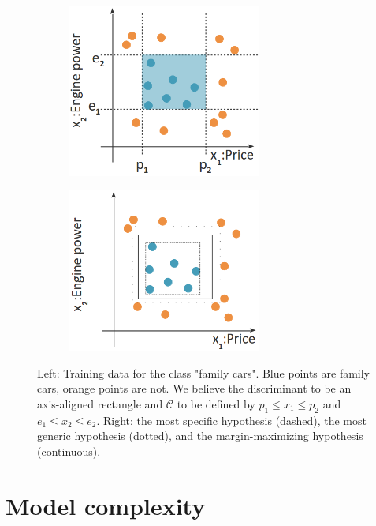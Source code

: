 \documentclass[a4paper,12pt]{article}
\newcommand{\cc}{\mathcal{C}}
\begin{document}
\begin{figure}[h]
  \centering
  \begin{subfigure}[c]{0.45\textwidth}
    \includegraphics[width=0.7\textwidth]{figures/car_data}
  \end{subfigure} \hfill
  \begin{subfigure}[c]{0.45\textwidth}
    \includegraphics[width=0.7\textwidth]{figures/car_data_2}
  \end{subfigure}
\caption{Left: Training data for the class "family cars". Blue points are family cars, orange points are not. We believe the discriminant to be an axis-aligned rectangle and $\cc$ to be defined by $p_1 \leq x_1 \leq p_2$ and $e_1 \leq x_2 \leq e_2$. Right: the most specific hypothesis (dashed), the most generic hypothesis (dotted), and the margin-maximizing hypothesis (continuous).}
  \label{fig:car_data}
\end{figure}


\section{Model complexity}
\end{document}
